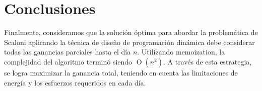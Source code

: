 \section{Conclusiones}

Finalmente, consideramos que la solución óptima para abordar la problemática de Scaloni aplicando la técnica de diseño
de programación dinámica debe considerar todas las ganancias parciales hasta el día $n$. Utilizando memoization,
la complejidad del algoritmo terminó siendo $\operatorname{O}(n^2)$.
A través de esta estrategia, se logra maximizar la ganancia total, teniendo en cuenta las limitaciones de energía y los 
esfuerzos requeridos en cada día. 

